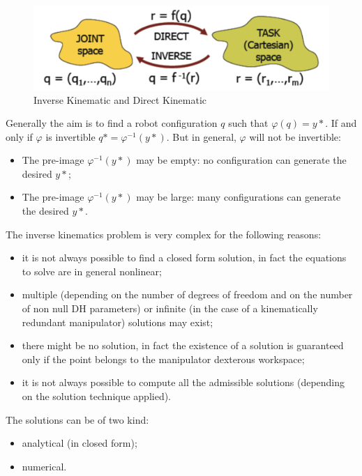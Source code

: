 \begin{figure}[h]
\begin{center}
\includegraphics[width=0.75\linewidth]{capitolo3/figure/ik}
\caption{Inverse Kinematic and Direct Kinematic}
\label{fig:ik} 
\end{center}
\end{figure}

Generally the aim is to find a robot configuration $q$ such that $\varphi(q)=y*$.
If and only if $\varphi$ is invertible $q* = \varphi^{-1}(y*)$.
But in general, $\varphi$ will not be invertible:
\begin{itemize}
    \item The pre-image $\varphi^{-1}(y*)$ may be empty: no configuration can generate the desired $y*$;
    \item The pre-image $\varphi^{-1}(y*)$ may be large: many configurations can generate the desired $y*$.
\end{itemize}

The inverse kinematics problem is very complex for the following reasons:
\begin{itemize}
    \item it is not always possible to find a closed form solution, in fact the equations to solve are in general nonlinear;
    \item multiple (depending on the number of degrees of freedom and on the number of non null DH parameters) or infinite (in the case of a kinematically redundant manipulator) solutions may exist;
    \item there might be no solution, in fact the existence of a solution is guaranteed only if the point belongs to the manipulator dexterous workspace;
    \item it is not always possible to compute all the admissible solutions (depending on the solution technique applied).
\end{itemize}

The solutions can be of two kind:
\begin{itemize}
    \item analytical (in closed form);
    \item numerical.
\end{itemize}

